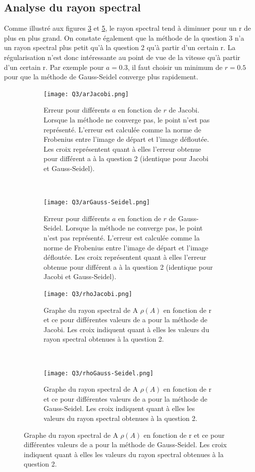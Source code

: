 \subsection{Analyse du rayon spectral}

Comme illustré aux figures \ref{fig:rhoj} et \ref{fig:rhogs}, le rayon spectral tend à diminuer pour un r de plus en plus grand. On constate également que la méthode de la question 3 n'a un rayon spectral plus petit qu'à la question 2 qu'à partir d'un certain r. La régularisation n'est donc intéressante au point de vue de la vitesse qu'à partir d'un certain r. Par exemple pour $a = 0.3$, il faut choisir un minimum de $r = 0.5$ pour que la méthode de Gauss-Seidel converge plus rapidement.

\begin{figure}
  \centering
  \begin{subfigure}[b]{0.45\textwidth}
    \texttt{[image: Q3/arJacobi.png]}
    \caption{Erreur pour différents $a$ en fonction de $r$ de Jacobi.
      Lorsque la méthode ne converge pas, le point n'est pas représenté.
      L'erreur est calculée comme la norme de Frobenius entre l'image de départ
      et l'image défloutée. Les croix représentent quant à elles l'erreur obtenue pour différent a à la question 2 (identique pour Jacobi et Gauss-Seidel).}
    \label{fig:arj}
  \end{subfigure}%
  ~
  \begin{subfigure}[b]{0.45\textwidth}
    \texttt{[image: Q3/arGauss-Seidel.png]}
    \caption{Erreur pour différents $a$ en fonction de $r$ de Gauss-Seidel.
      Lorsque la méthode ne converge pas, le point n'est pas représenté.
      L'erreur est calculée comme la norme de Frobenius entre l'image de départ
      et l'image défloutée. Les croix représentent quant à elles l'erreur obtenue pour différent a à la question 2 (identique pour Jacobi et Gauss-Seidel).}
    \label{fig:args}
  \end{subfigure}

  \begin{subfigure}[b]{0.45\textwidth}
    \texttt{[image: Q3/rhoJacobi.png]}
    \caption{Graphe du rayon spectral de A $\rho(A)$ en fonction de r et ce pour différentes valeurs de a pour la méthode de Jacobi. Les croix indiquent quant à elles les valeurs du rayon spectral obtenues à la question 2.}
    \label{fig:rhoj}
  \end{subfigure}%
  ~
  \begin{subfigure}[b]{0.45\textwidth}
    \texttt{[image: Q3/rhoGauss-Seidel.png]}
    \caption{Graphe du rayon spectral de A $\rho(A)$ en fonction de r et ce pour différentes valeurs de a pour la méthode de Gauss-Seidel. Les croix indiquent quant à elles les valeurs du rayon spectral obtenues à la question 2.}
    \label{fig:rhogs}
  \end{subfigure}
\end{figure}

